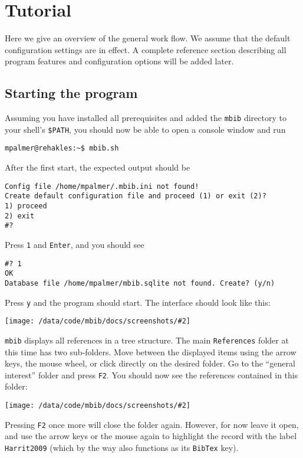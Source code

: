 \documentclass[10pt]{article}
\newcommand*{\mbib}{\texttt{mbib}\xspace}
\newcommand*{\bibtex}{\texttt{BibTex}\xspace}
\newcommand*{\key}[1]{\texttt{#1}\xspace}
\newcommand{\screenshot}[2][]{%
\medskip\par
\begin{center}
\texttt{[image: /data/code/mbib/docs/screenshots/\#2]}
\end{center}}
\begin{document}
\section{Tutorial}
\label{sec:tutorial}

Here we give an overview of the general work flow. We assume that the default configuration settings are in effect. A complete reference section describing all program features and configuration options will be added later. 

\subsection{Starting the program}

Assuming you have installed all prerequisites and added the \mbib directory to your shell's \texttt{\$PATH}, you should now be able to open a console window and run 

\begin{verbatim}
mpalmer@rehakles:~$ mbib.sh
\end{verbatim}

\noindent After the first start, the expected output should be 

\begin{verbatim}
Config file /home/mpalmer/.mbib.ini not found!
Create default configuration file and proceed (1) or exit (2)?
1) proceed
2) exit
#? 
\end{verbatim}

\noindent Press \key{1} and \key{Enter}, and you should see

\begin{verbatim}
#? 1
OK
Database file /home/mpalmer/mbib.sqlite not found. Create? (y/n) 
\end{verbatim}

\noindent Press \key{y} and the program should start. The interface should look like this:

\screenshot{initial-screen}

\noindent \mbib displays all references in a tree structure. The main \texttt{References} folder at this time has two sub-folders. Move between the displayed items using the arrow keys, the mouse wheel, or click directly on the desired folder. Go to the ``general interest'' folder and press \key{F2}. You should now see the references contained in this folder:

\screenshot{f2-pressed}

\noindent Pressing \key{F2} once more will close the folder again. However, for now leave it open, and use the arrow keys or the mouse again to highlight the record with the label  \texttt{Harrit2009} (which by the way also functions as its \bibtex key). 
\end{document}
